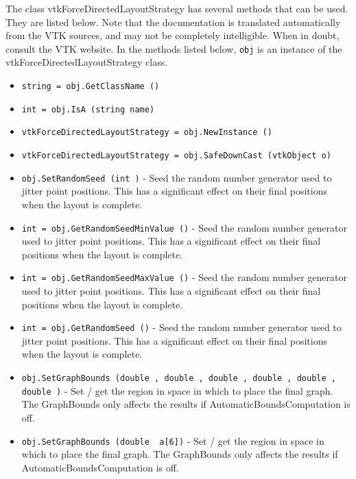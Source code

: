 The class vtkForceDirectedLayoutStrategy has several methods that can be used.
  They are listed below.
Note that the documentation is translated automatically from the VTK sources,
and may not be completely intelligible.  When in doubt, consult the VTK website.
In the methods listed below, \verb|obj| is an instance of the vtkForceDirectedLayoutStrategy class.
\begin{itemize}
\item  \verb|string = obj.GetClassName ()|

\item  \verb|int = obj.IsA (string name)|

\item  \verb|vtkForceDirectedLayoutStrategy = obj.NewInstance ()|

\item  \verb|vtkForceDirectedLayoutStrategy = obj.SafeDownCast (vtkObject o)|

\item  \verb|obj.SetRandomSeed (int )| -  Seed the random number generator used to jitter point positions.
 This has a significant effect on their final positions when
 the layout is complete.

\item  \verb|int = obj.GetRandomSeedMinValue ()| -  Seed the random number generator used to jitter point positions.
 This has a significant effect on their final positions when
 the layout is complete.

\item  \verb|int = obj.GetRandomSeedMaxValue ()| -  Seed the random number generator used to jitter point positions.
 This has a significant effect on their final positions when
 the layout is complete.

\item  \verb|int = obj.GetRandomSeed ()| -  Seed the random number generator used to jitter point positions.
 This has a significant effect on their final positions when
 the layout is complete.

\item  \verb|obj.SetGraphBounds (double , double , double , double , double , double )| -  Set / get the region in space in which to place the final graph.
 The GraphBounds only affects the results if AutomaticBoundsComputation
 is off.

\item  \verb|obj.SetGraphBounds (double  a[6])| -  Set / get the region in space in which to place the final graph.
 The GraphBounds only affects the results if AutomaticBoundsComputation
 is off.


\end{itemize}

